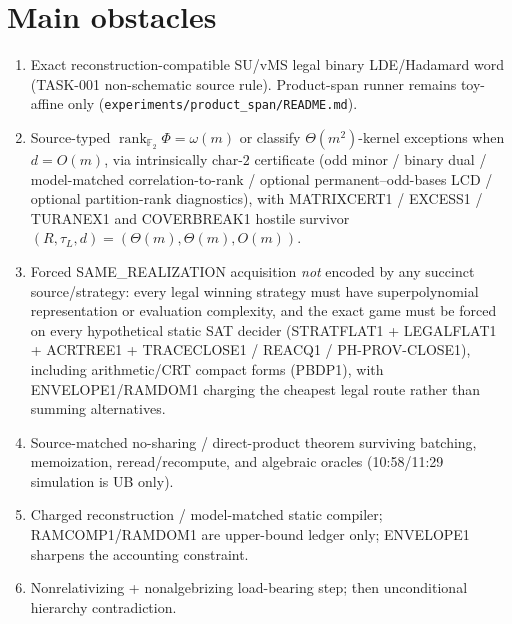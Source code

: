 \documentclass[11pt]{article}
\begin{document}
\section*{Main obstacles}
\begin{enumerate}
\item Exact reconstruction-compatible SU/vMS legal binary LDE/Hadamard word (TASK-001
non-schematic source rule). Product-span runner remains toy-affine only
(\texttt{experiments/product\_span/README.md}).
\item Source-typed $\operatorname{rank}_{\mathbb F_2}\Phi=\omega(m)$ or classify
$\Theta(m^2)$-kernel exceptions when $d=O(m)$, via intrinsically char-$2$ certificate
(odd minor / binary dual / model-matched correlation-to-rank / optional permanent--odd-bases
LCD / optional partition-rank diagnostics), with MATRIXCERT1 / EXCESS1 / TURANEX1 and
COVERBREAK1 hostile survivor $(R,\tau_L,d)=(\Theta(m),\Theta(m),O(m))$.
\item Forced SAME\_REALIZATION acquisition \emph{not} encoded by any succinct source/strategy:
every legal winning strategy must have superpolynomial representation or evaluation complexity,
and the exact game must be forced on every hypothetical static SAT decider
(STRATFLAT1 + LEGALFLAT1 + ACRTREE1 + TRACECLOSE1 / REACQ1 / PH-PROV-CLOSE1),
including arithmetic/CRT compact forms (PBDP1), with ENVELOPE1/RAMDOM1 charging the
cheapest legal route rather than summing alternatives.
\item Source-matched no-sharing / direct-product theorem surviving batching, memoization,
reread/recompute, and algebraic oracles (10:58/11:29 simulation is UB only).
\item Charged reconstruction / model-matched static compiler; RAMCOMP1/RAMDOM1 are
upper-bound ledger only; ENVELOPE1 sharpens the accounting constraint.
\item Nonrelativizing + nonalgebrizing load-bearing step; then unconditional hierarchy contradiction.
\end{enumerate}
\end{document}
